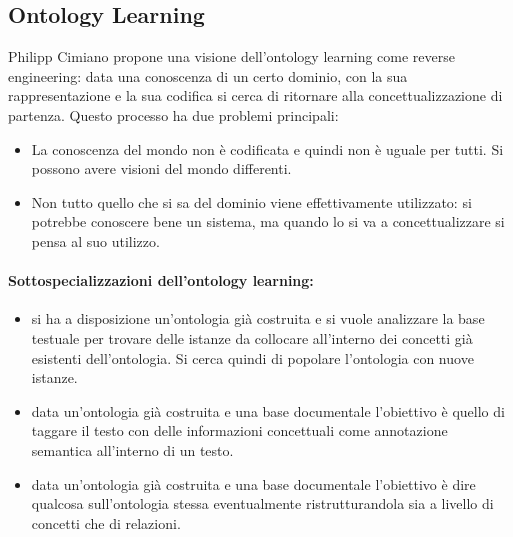 \subsection{Ontology Learning}

Philipp Cimiano propone una visione dell'ontology learning come reverse engineering: data una conoscenza di un certo dominio, con la sua rappresentazione e la sua codifica si cerca di ritornare alla concettualizzazione di partenza. Questo processo ha due problemi principali:

\begin{itemize}
  \item La conoscenza del mondo non è codificata e quindi non è uguale per tutti. Si possono avere visioni del mondo differenti. 
  \item Non tutto quello che si sa del dominio viene effettivamente utilizzato: si potrebbe conoscere bene un sistema, ma quando lo si va a concettualizzare si pensa al suo utilizzo.
\end{itemize}

\paragraph{Sottospecializzazioni dell'ontology learning:}

\begin{itemize}
  \item {} si ha a disposizione un'ontologia già costruita e si vuole analizzare la base testuale per trovare delle istanze da collocare all'interno dei concetti già esistenti dell'ontologia. Si cerca quindi di popolare l'ontologia con nuove istanze. 
  \item {} data un'ontologia già costruita e una base documentale l'obiettivo è quello di taggare il testo con delle informazioni concettuali come annotazione semantica all'interno di un testo. 
  \item {} data un'ontologia già costruita e una base documentale l'obiettivo è dire qualcosa sull'ontologia stessa eventualmente ristrutturandola sia a livello di concetti che di relazioni. 
\end{itemize}


